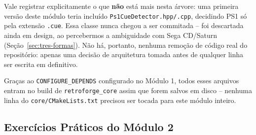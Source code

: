 \begin{CaixaInfo}
Vale registrar explicitamente o que \textbf{não} está mais nesta árvore: uma primeira versão deste módulo teria incluído \texttt{Ps1CueDetector.hpp/.cpp}, decidindo PS1 só pela extensão \texttt{.cue}. Essa classe nunca chegou a ser commitada -- foi descartada ainda em design, ao percebermos a ambiguidade com Sega CD/Saturn (Seção~\ref{sec:tres-formas}). Não há, portanto, nenhuma remoção de código real do repositório: apenas uma decisão de arquitetura tomada antes de qualquer linha ser escrita em definitivo.
\end{CaixaInfo}

Graças ao \texttt{CONFIGURE\_DEPENDS} configurado no Módulo 1, todos esses arquivos entram no build de \texttt{retroforge\_core} assim que forem salvos em disco -- nenhuma linha do \texttt{core/CMakeLists.txt} precisou ser tocada para este módulo inteiro.

\subsection{Exercícios Práticos do Módulo 2}

